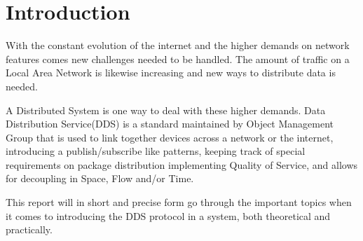\chapter{Introduction}
With the constant evolution of the internet and the higher demands on network features comes new challenges needed to be handled. The amount of traffic on a Local Area Network is likewise increasing and new ways to distribute data is needed.

A Distributed System is one way to deal with these higher demands. Data Distribution Service(DDS) is a standard maintained by Object Management Group that is used to link together devices across a network or the internet, introducing a publish/subscribe like patterns, keeping track of special requirements on package distribution implementing Quality of Service, and allows for decoupling in Space, Flow and/or Time.

This report will in short and precise form go through the important topics when it comes to introducing the DDS protocol in a system, both theoretical and practically.


